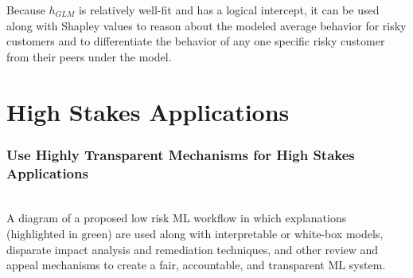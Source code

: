 \documentclass[11pt,
               aspectratio=169,
               hyperref={colorlinks}
               ]{beamer}
\begin{document}
\begin{frame}[t, label={lime}]
	\scriptsize{Because $h_{GLM}$ is relatively well-fit and has a logical intercept, it can be used along with Shapley values to reason about the modeled average behavior for risky customers and to differentiate the behavior of any one specific risky customer from their peers under the model.}

	\end{frame}


	\section{High Stakes Applications}

	\begin{frame}
	
		\frametitle{Use Highly Transparent Mechanisms for High Stakes Applications}	
		
		\\
		\vspace{5pt}
		\scriptsize{A diagram of a proposed low risk ML workflow in which explanations (highlighted in green) are used along with interpretable or white-box models, disparate impact analysis and remediation techniques, and other review and appeal mechanisms to create a fair, accountable, and transparent ML system.}
	
	\end{frame}
\end{document}
